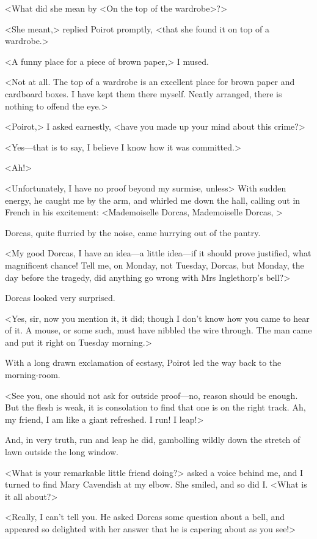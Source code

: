  <What did she mean by <On the top of the wardrobe>?> 

 <She meant,> replied Poirot promptly, <that she found it on top of a wardrobe.> 

 <A funny place for a piece of brown paper,> I mused. 

 <Not at all. The top of a wardrobe is an excellent place for brown paper and cardboard boxes. I have kept them there myself. Neatly arranged, there is nothing to offend the eye.> 

 <Poirot,> I asked earnestly, <have you made up your mind about this crime?> 

 <Yes—that is to say, I believe I know how it was committed.> 

 <Ah!> 

 <Unfortunately, I have no proof beyond my surmise, unless\longdash> With sudden energy, he caught me by the arm, and whirled me down the hall, calling out in French in his excitement: <Mademoiselle Dorcas, Mademoiselle Dorcas, > 

 Dorcas, quite flurried by the noise, came hurrying out of the pantry. 

 <My good Dorcas, I have an idea—a little idea—if it should prove justified, what magnificent chance! Tell me, on Monday, not Tuesday, Dorcas, but Monday, the day before the tragedy, did anything go wrong with Mrs Inglethorp's bell?> 

 Dorcas looked very surprised. 

 <Yes, sir, now you mention it, it did; though I don't know how you came to hear of it. A mouse, or some such, must have nibbled the wire through. The man came and put it right on Tuesday morning.> 

 With a long drawn exclamation of ecstasy, Poirot led the way back to the morning-room. 

 <See you, one should not ask for outside proof—no, reason should be enough. But the flesh is weak, it is consolation to find that one is on the right track. Ah, my friend, I am like a giant refreshed. I run! I leap!> 

 And, in very truth, run and leap he did, gambolling wildly down the stretch of lawn outside the long window. 

 <What is your remarkable little friend doing?> asked a voice behind me, and I turned to find Mary Cavendish at my elbow. She smiled, and so did I. <What is it all about?> 

 <Really, I can't tell you. He asked Dorcas some question about a bell, and appeared so delighted with her answer that he is capering about as you see!> 

